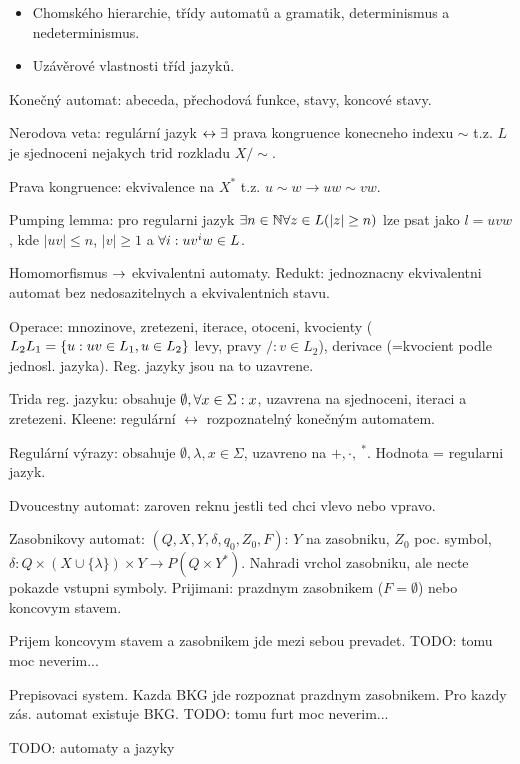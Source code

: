 \begin{itemize}
\item Chomského hierarchie, třídy automatů a gramatik, determinismus a
nedeterminismus.
\item Uzávěrové vlastnosti tříd jazyků.
\end{itemize}

Konečný automat: abeceda, přechodová funkce, stavy, koncové stavy.

Nerodova veta: regulární jazyk $\leftrightarrow \exists$ prava kongruence konecneho
indexu $\sim$ t.z. $L$ je sjednoceni nejakych trid rozkladu $X/\sim$.

Prava kongruence: ekvivalence na $X^*$ t.z. $u\sim w\rightarrow uw\sim vw$.

Pumping lemma: pro regularni jazyk $\exists n\in\mathbb{N} \forall z\in L (|z|\geq n)$ lze
psat jako $l=uvw$, kde $|uv|\leq n$, $|v|\geq 1$ a $\forall i: uv^i w\in L$.

Homomorfismus $\rightarrow$ ekvivalentni automaty. Redukt: jednoznacny
ekvivalentni automat bez nedosazitelnych a ekvivalentnich stavu.

Operace: mnozinove, zretezeni, iterace, otoceni, kvocienty ($L_2\\ L_1=\{u:uv\in
L_1, u\in L_2\}$ levy, pravy $/: v\in L_2$), derivace (=kvocient podle jednosl.
jazyka). Reg. jazyky jsou na to uzavrene.

Trida reg. jazyku: obsahuje $\emptyset, \forall x\in\Sigma: x$, uzavrena na
sjednoceni, iteraci a zretezeni. Kleene: regulární $\leftrightarrow$
rozpoznatelný konečným automatem.

Regulární výrazy: obsahuje $\emptyset, \lambda, x\in\Sigma$, uzavreno na
$+,\cdot,\ ^*$. Hodnota = regularni jazyk.

Dvoucestny automat: zaroven reknu jestli ted chci vlevo nebo vpravo.

Zasobnikovy automat: $(Q,X,Y,\delta,q_0,Z_0,F)$: $Y$ na zasobniku, $Z_0$ poc.
symbol, $\delta:Q\times (X\cup\{\lambda\})\times Y\rightarrow P(Q\times Y^*)$.
Nahradi vrchol zasobniku, ale necte pokazde vstupni symboly.
Prijimani: prazdnym zasobnikem ($F=\emptyset$) nebo koncovym stavem.

Prijem koncovym stavem a zasobnikem jde mezi sebou prevadet.
TODO: tomu moc neverim...

Prepisovaci system.
Kazda BKG jde rozpoznat prazdnym zasobnikem.
Pro kazdy zás. automat existuje BKG.
TODO: tomu furt moc neverim...

TODO: automaty a jazyky
